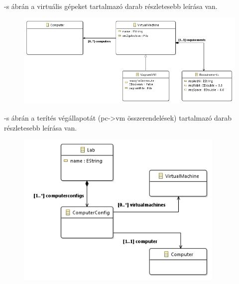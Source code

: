 -s ábrán a virtuális gépeket tartalmazó darab részletesebb leírása van.

\begin{figure}[ht]
	\centering
	\includegraphics[width=130mm, keepaspectratio]{figures/design_vm.png}
	\caption{}
	\label{fig:designvm}
\end{figure}

-s ábrán a terítés végállapotát (pc->vm összerendelések) tartalmazó darab részletesebb leírása van.

\begin{figure}[ht]
	\centering
	\includegraphics[width=100mm, keepaspectratio]{figures/design_lab.png}
	\caption{}
	\label{fig:designlab}
\end{figure}

